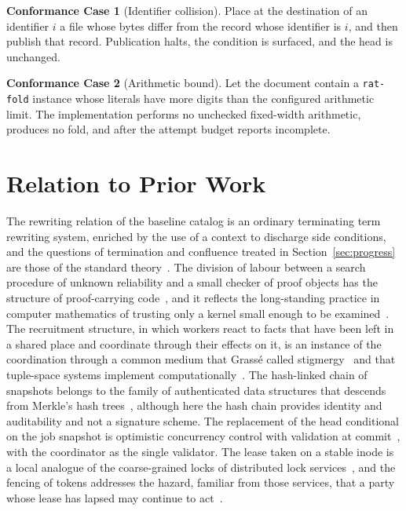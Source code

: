 \documentclass[11pt,a4paper]{article}
\theoremstyle{plain}
\theoremstyle{definition}
\theoremstyle{remark}
\theoremstyle{definition}
\newtheorem{case}{Conformance Case}
\newcommand{\code}[1]{\texttt{#1}}
\begin{document}
\begin{case}[Identifier collision]
Place at the destination of an identifier $i$ a file whose bytes differ from the record whose identifier is $i$, and then publish that record. Publication halts, the condition is surfaced, and the head is unchanged.
\end{case}

\begin{case}[Arithmetic bound]
Let the document contain a \code{rat-fold} instance whose literals have more digits than the configured arithmetic limit. The implementation performs no unchecked fixed-width arithmetic, produces no fold, and after the attempt budget reports incomplete.
\end{case}

\section{Relation to Prior Work}
\label{sec:related}

The rewriting relation of the baseline catalog is an ordinary terminating term rewriting system, enriched by the use of a context to discharge side conditions, and the questions of termination and confluence treated in Section~\ref{sec:progress} are those of the standard theory~\cite{dershowitz1990,baader1998,newman1942}. The division of labour between a search procedure of unknown reliability and a small checker of proof objects has the structure of proof-carrying code~\cite{necula1997}, and it reflects the long-standing practice in computer mathematics of trusting only a kernel small enough to be examined~\cite{barendregt2005}. The recruitment structure, in which workers react to facts that have been left in a shared place and coordinate through their effects on it, is an instance of the coordination through a common medium that Grass\'e called stigmergy~\cite{grasse1959} and that tuple-space systems implement computationally~\cite{gelernter1985}. The hash-linked chain of snapshots belongs to the family of authenticated data structures that descends from Merkle's hash trees~\cite{merkle1988}, although here the hash chain provides identity and auditability and not a signature scheme. The replacement of the head conditional on the job snapshot is optimistic concurrency control with validation at commit~\cite{kung1981}, with the coordinator as the single validator. The lease taken on a stable inode is a local analogue of the coarse-grained locks of distributed lock services~\cite{burrows2006}, and the fencing of tokens addresses the hazard, familiar from those services, that a party whose lease has lapsed may continue to act~\cite{kleppmann2017}.
\end{document}
